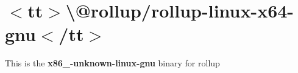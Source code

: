 \chapter{\texorpdfstring{$<$}{<}tt\texorpdfstring{$>$}{>}\textbackslash{}@rollup/rollup-\/linux-\/x64-\/gnu\texorpdfstring{$<$}{<}/tt\texorpdfstring{$>$}{>}}
\hypertarget{md__2home_2solype_2delivery_2current__days_2trello_2front_2node__modules_2_0drollup_2rollup-linux-x64-gnu_2README}{}\label{md__2home_2solype_2delivery_2current__days_2trello_2front_2node__modules_2_0drollup_2rollup-linux-x64-gnu_2README}
\label{md__2home_2solype_2delivery_2current__days_2trello_2front_2node__modules_2_0drollup_2rollup-linux-x64-gnu_2README_autotoc_md8302}%
%
 This is the {\bfseries{x86\+\_-\/unknown-\/linux-\/gnu}} binary for {\ttfamily rollup} 